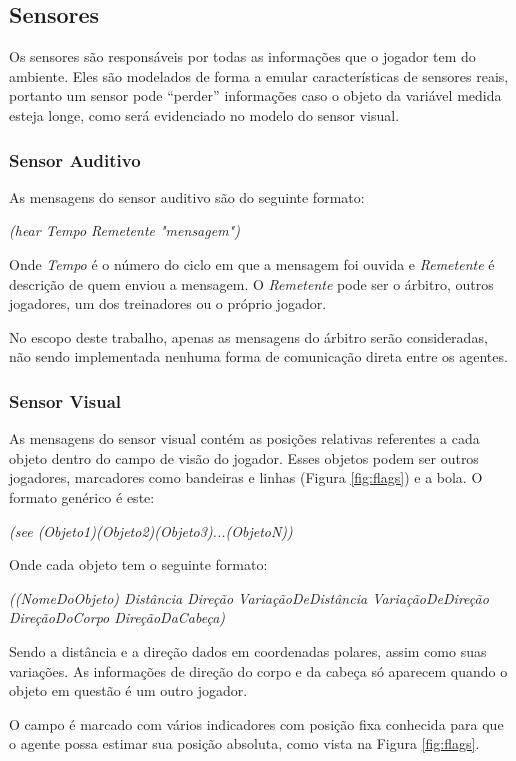 \subsection{Sensores}
\par Os sensores são responsáveis por todas as informações que o jogador tem do ambiente. Eles são modelados de forma a emular características de sensores reais, portanto um sensor pode ``perder'' informações caso o objeto da variável medida esteja longe, como será evidenciado no modelo do sensor visual.

\subsubsection{Sensor Auditivo}

As mensagens do sensor auditivo são do seguinte formato:

\textit{(hear Tempo Remetente "mensagem")}

Onde \textit{Tempo} é o número do ciclo em que a mensagem foi ouvida e \textit{Remetente} é descrição de quem enviou a mensagem. O \textit{Remetente} pode ser o árbitro, outros jogadores, um dos treinadores ou o próprio jogador.

No escopo deste trabalho, apenas as mensagens do árbitro serão consideradas, não sendo implementada nenhuma forma de comunicação direta entre os agentes.

\subsubsection{Sensor Visual}
\label{sec:visual}
As mensagens do sensor visual contém as posições relativas referentes a cada objeto dentro do campo de visão do jogador. Esses objetos podem ser outros jogadores, marcadores como bandeiras e linhas (Figura \ref{fig:flags}) e a bola. O formato genérico é este:

\textit{(see (Objeto1)(Objeto2)(Objeto3)...(ObjetoN))}

Onde cada objeto tem o seguinte formato:

\textit{((NomeDoObjeto) Distância Direção VariaçãoDeDistância VariaçãoDeDireção DireçãoDoCorpo DireçãoDaCabeça)}

Sendo a distância e a direção dados em coordenadas polares, assim como suas variações. As informações de direção do corpo e da cabeça só aparecem quando o objeto em questão é um outro jogador.

O campo é marcado com vários indicadores com posição fixa conhecida para que o agente possa estimar sua posição absoluta, como vista na Figura \ref{fig:flags}.

